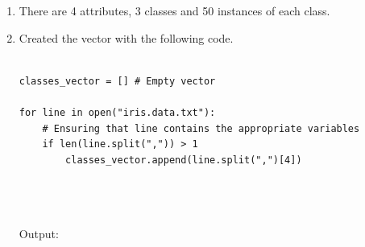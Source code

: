 \documentclass[12pt]{report}
\begin{document}
\begin{enumerate}

\item There are 4 attributes, 3 classes and 50 instances of each class.

\item Created the vector with the following code.
\begin{lstlisting}

classes_vector = [] # Empty vector

for line in open("iris.data.txt"):
    # Ensuring that line contains the appropriate variables
    if len(line.split(",")) > 1
    	classes_vector.append(line.split(",")[4])




\end{lstlisting}

Output:


\end{enumerate}
\end{document}
